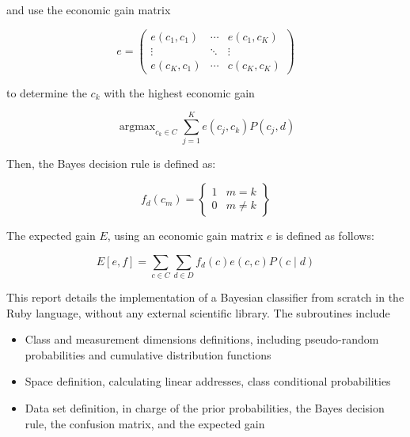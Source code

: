 \documentclass[letterpaper, conference]{IEEEtran}
\DeclareMathOperator*{\argmax}{argmax}
\begin{document}
and use the economic gain matrix

\begin{equation}
  e =
  \begin{pmatrix}
    e(c_1,c_1) & \cdots & e(c_1,c_K) \\
      \vdots   & \ddots &    \vdots   \\
    e(c_K,c_1) & \cdots & c(c_K,c_K) 
  \end{pmatrix}
\end{equation}

to determine the $c_k$ with the highest economic gain

\begin{equation}
  \argmax_{c_k \in C} \sum_{j = 1}^{K} e(c_j, c_k)P(c_j, d)
\end{equation}

Then, the Bayes decision rule is defined as:

\begin{equation}
  f_d(c_m) = \left\{
  \begin{array}{lr}
  1 & m = k\\
  0 & m \neq k
  \end{array}\right\}
\end{equation}

The expected gain $E$, using an economic gain matrix $e$ is defined as follows:

\begin{equation}
  E[e, f] = \sum_{c \in C} \sum_{d \in D}f_d(c)e(c, c)P(c \mid d)
\end{equation}

This report details the implementation of a Bayesian classifier from scratch in the Ruby language, without any external scientific library. The subroutines include

\begin{itemize}

  \item Class and measurement dimensions definitions, including pseudo-random probabilities and cumulative distribution functions

  \item Space definition, calculating linear addresses, class conditional probabilities
 
  \item Data set definition, in charge of the prior probabilities, the Bayes decision rule, the confusion matrix, and the expected gain

\end{itemize}
\end{document}
